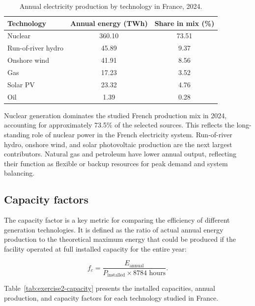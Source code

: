 \documentclass[a4paper]{report}
\begin{document}
\begin{table}[H]
  \centering
  \caption{Annual electricity production by technology in France, 2024.}
  \label{tab:exercise2-annual-prod}
  \begin{tabular}{lcc}
    \toprule
    Technology & Annual energy (TWh) & Share in mix (\%) \\
    \midrule
    Nuclear & 360.10 & 73.51 \\
    Run-of-river hydro & 45.89 & 9.37 \\
    Onshore wind & 41.91 & 8.56 \\
    Gas & 17.23 & 3.52 \\
    Solar PV & 23.32 & 4.76 \\
    Oil & 1.39 & 0.28 \\
    \bottomrule
  \end{tabular}
\end{table}

Nuclear generation dominates the studied French production mix in 2024, accounting for approximately 73.5\% of the selected sources. This reflects the long-standing role of nuclear power in the French electricity system. Run-of-river hydro, onshore wind, and solar photovoltaic production are the next largest contributors. Natural gas and petroleum have lower annual output, reflecting their function as flexible or backup resources for peak demand and system balancing.

\subsection{Capacity factors}

The capacity factor is a key metric for comparing the efficiency of different generation technologies. It is defined as the ratio of actual annual energy production to the theoretical maximum energy that could be produced if the facility operated at full installed capacity for the entire year:

\[
f_c = \frac{E_{\mathrm{annual}}}{P_{\mathrm{installed}} \times 8784 \text{ hours}}.
\]

Table~\ref{tab:exercise2-capacity} presents the installed capacities, annual production, and capacity factors for each technology studied in France.
\end{document}
